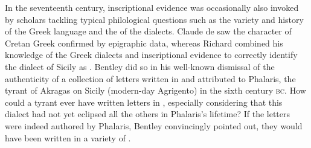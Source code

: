 In the seventeenth century, inscriptional evidence was occasionally also invoked by scholars tackling typical philological questions such as the variety and history of the Greek language and the  of the dialects. Claude de \citet[430]{Saumaise1643a} saw the  character of Cretan Greek confirmed by epigraphic data, whereas Richard \citet[311]{Bentley1699} combined his knowledge of the Greek dialects and inscriptional evidence to correctly identify the dialect of Sicily as . Bentley did so in his well-known dismissal of the authenticity of a collection of letters written in  and attributed to Phalaris, the tyrant of Akragas on Sicily (modern-day Agrigento) in the sixth century \textsc{bc}. How could a  tyrant ever have written letters in , especially considering that this dialect had not yet eclipsed all the others in Phalaris’s lifetime? If the letters were indeed authored by Phalaris, Bentley convincingly pointed out, they would have been written in a variety of .

